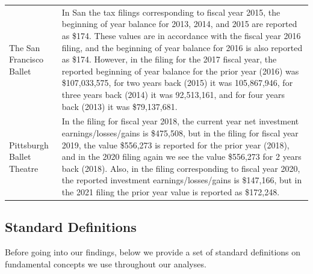 \documentclass[Dance Data
Project,article,submit,moreauthors,pdftex]{mdpi}
\begin{document}
\begin{table}[H]
\begin{tabular}[t]{l>{\raggedright\arraybackslash}p{35em}}
\addlinespace
The San Francisco Ballet & In San the tax filings corresponding to fiscal year 2015, the beginning of year balance for 2013, 2014, and 2015 are reported as \$174.  These values are in accordance with the fiscal year 2016 filing, and the beginning of year balance for 2016 is also reported as \$174.  However, in the filing for the 2017 fiscal year, the reported beginning of year balance for the prior year (2016) was \$107,033,575, for two years back (2015) it was  105,867,946, for three years back (2014) it was 92,513,161, and for four years back (2013) it was \$79,137,681.\\
\addlinespace
Pittsburgh Ballet Theatre & In the filing for fiscal year 2018, the current year net investment earnings/losses/gains is \$475,508, but in the filing for fiscal year 2019, the value \$556,273 is reported for the prior year (2018), and in the 2020 filing again we see the value \$556,273 for 2 years back (2018). Also, in the filing corresponding to fiscal year 2020, the reported investment earnings/losses/gains is \$147,166, but in the 2021 filing the prior year value is reported as \$172,248.\\
\bottomrule
\end{tabular}
\end{table}

\newpage

\hypertarget{standard-definitions}{%
\subsection{Standard Definitions}\label{standard-definitions}}

Before going into our findings, below we provide a set of standard
definitions on fundamental concepts we use throughout our analyses.
\end{document}
